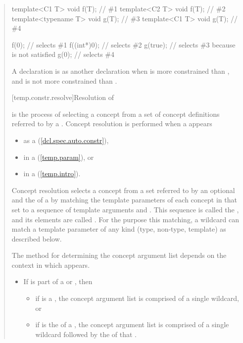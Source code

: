 \begin{quote}
\begin{codeblock}
template<C1 T> void f(T);       // \#1
template<C2 T> void f(T);       // \#2
template<typename T> void g(T); // \#3
template<C1 T> void g(T);       // \#4

f(0);       // selects \#1
f((int*)0); // selects \#2
g(true);    // selects \#3 because  is not satisfied
g(0);       // selects \#4
\end{codeblock}
\exitexample

\pnum
A declaration  is 
as another declaration  when  is more
constrained than , and  is not more
constrained than .


[temp.constr.resolve]{Resolution of }

\pnum
{} is the process of selecting a concept 
from a set of concept definitions referred to by a 
.
% 
Concept resolution is performed when a  
appears
\begin{itemize}
\item as a  (\ref{dcl.spec.auto.constr}), 
\item in a  (\ref{temp.param}), or 
\item in a  (\ref{temp.intro}).
\end{itemize}

\pnum
Concept resolution selects a concept from a set referred to by an
optional  and the  
of a  by matching the template parameters 
of each concept in that set to a sequence of template arguments and 
.
% 
This sequence is called the , and its elements
are called .
% 
For the purpose this matching, a wildcard can match a template 
parameter of any kind (type, non-type, template) as described below.

\pnum
The method for determining the concept argument list depends on the
context in which   appears.
% 
\begin{itemize}
\item If  is part of a  or 
,
then
  \begin{itemize}
  \item if  is a , the concept 
  argument list is comprised of a single wildcard, or
  \item if  is the  of a 
  , the concept argument list is comprised of a
  single wildcard followed by the  of that 
  .
  \end{itemize}


\end{itemize}
\end{quote}
